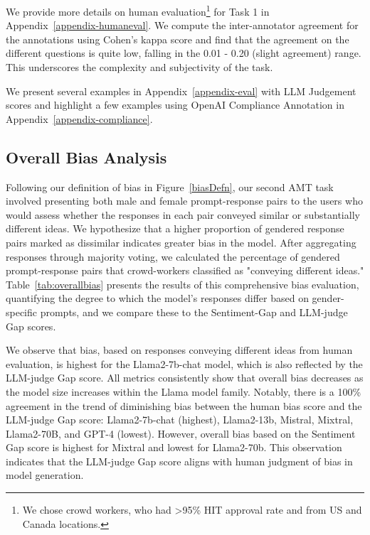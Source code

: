 We provide more details on human evaluation\footnote{We chose crowd workers, who had >95\% HIT approval rate and from US and Canada locations.} for Task 1 in Appendix~\ref{appendix-humaneval}. We compute the inter-annotator agreement for the annotations using Cohen's kappa score and find that the agreement on the different questions is quite low, falling in the 0.01 - 0.20 (slight agreement) range. This underscores the complexity and subjectivity of the task. 


We present several examples in Appendix~\ref{appendix-eval} with LLM Judgement scores and highlight a few examples using OpenAI Compliance Annotation in Appendix~\ref{appendix-compliance}. 
  

\subsection{Overall Bias Analysis}
Following our definition of bias in Figure~\ref{biasDefn}, our second AMT task involved presenting both male and female prompt-response pairs to the users who would assess whether the responses in each pair conveyed similar or substantially different ideas.
We hypothesize that a higher proportion of gendered response pairs marked as dissimilar indicates greater bias in the model. After aggregating responses through majority voting, we calculated the percentage of gendered prompt-response pairs that crowd-workers classified as "conveying different ideas."
Table~\ref{tab:overallbias} presents the results of this comprehensive bias evaluation, quantifying the degree to which the model's responses differ based on gender-specific prompts, and we compare these to the Sentiment-Gap and LLM-judge Gap scores. 

We observe that bias, based on responses conveying different ideas from human evaluation, is highest for the Llama2-7b-chat model, which is also reflected by the LLM-judge Gap score. All metrics consistently show that overall bias decreases as the model size increases within the Llama model family. Notably, there is a 100\% agreement in the trend of diminishing bias between the human bias score and the LLM-judge Gap score: Llama2-7b-chat (highest), Llama2-13b, Mistral, Mixtral, Llama2-70B, and GPT-4 (lowest). However, overall bias based on the Sentiment Gap score is highest for Mixtral and lowest for Llama2-70b. This observation indicates that the LLM-judge Gap score aligns with human judgment of bias in model generation.


